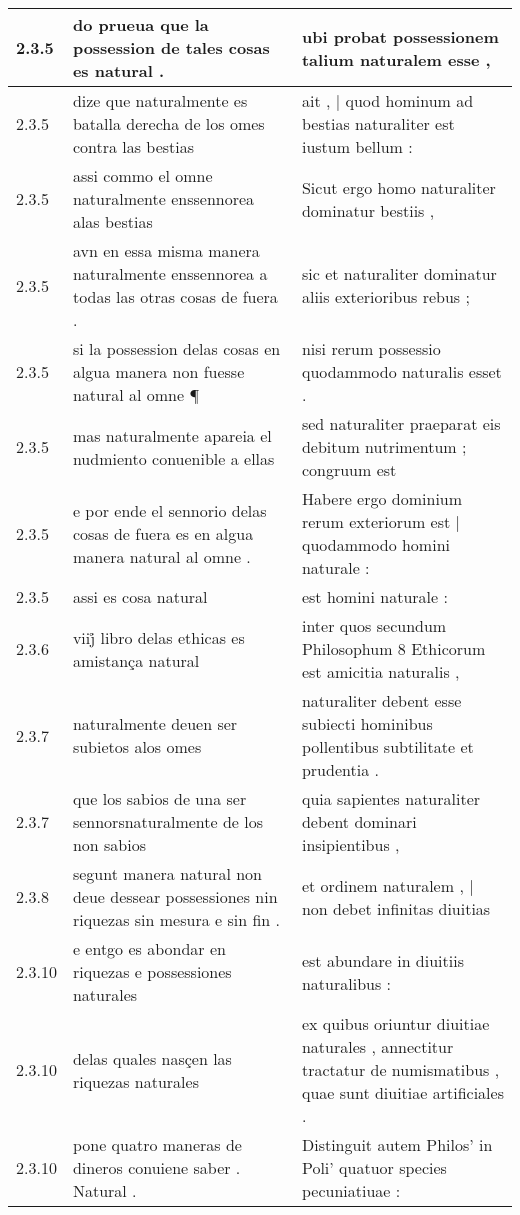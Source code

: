 \begin{tabular}{|p{1cm}|p{6.5cm}|p{6.5cm}|}
2.3.5 & do prueua que la possession de tales cosas es natural . & ubi probat possessionem talium naturalem esse , \\\hline
2.3.5 & dize que naturalmente es batalla derecha de los omes contra las bestias & ait , | quod hominum ad bestias naturaliter est iustum bellum : \\\hline
2.3.5 & assi commo el omne naturalmente enssennorea alas bestias & Sicut ergo homo naturaliter dominatur bestiis , \\\hline
2.3.5 & avn en essa misma manera naturalmente enssennorea a todas las otras cosas de fuera . & sic et naturaliter dominatur aliis exterioribus rebus ; \\\hline
2.3.5 & si la possession delas cosas en algua manera non fuesse natural al omne ¶ & nisi rerum possessio quodammodo naturalis esset . \\\hline
2.3.5 & mas naturalmente apareia el nudmiento conuenible a ellas & sed naturaliter praeparat eis debitum nutrimentum ; congruum est \\\hline
2.3.5 & e por ende el sennorio delas cosas de fuera es en algua manera natural al omne . & Habere ergo dominium rerum exteriorum est | quodammodo homini naturale : \\\hline
2.3.5 & assi es cosa natural & est homini naturale : \\\hline
2.3.6 & viij̊ libro delas ethicas es amistança natural & inter quos secundum Philosophum 8 Ethicorum est amicitia naturalis , \\\hline
2.3.7 & naturalmente deuen ser subietos alos omes & naturaliter debent esse subiecti hominibus pollentibus subtilitate et prudentia . \\\hline
2.3.7 & que los sabios de una ser sennorsnaturalmente de los non sabios & quia sapientes naturaliter debent dominari insipientibus , \\\hline
2.3.8 & segunt manera natural non deue dessear possessiones nin riquezas sin mesura e sin fin . & et ordinem naturalem , | non debet infinitas diuitias \\\hline
2.3.10 & e entgo es abondar en riquezas e possessiones naturales & est abundare in diuitiis naturalibus : \\\hline
2.3.10 & delas quales nasçen las riquezas naturales & ex quibus oriuntur diuitiae naturales , annectitur tractatur de numismatibus , quae sunt diuitiae artificiales . \\\hline
2.3.10 & pone quatro maneras de dineros conuiene saber . Natural . & Distinguit autem Philos’ in Poli’ quatuor species pecuniatiuae : \\\hline

\end{tabular}
